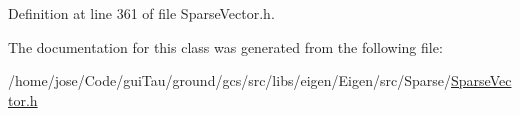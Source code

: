 Definition at line 361 of file Sparse\-Vector.\-h.



The documentation for this class was generated from the following file\-:\begin{DoxyCompactItemize}
\item 
/home/jose/\-Code/gui\-Tau/ground/gcs/src/libs/eigen/\-Eigen/src/\-Sparse/\hyperlink{_sparse_vector_8h}{Sparse\-Vector.\-h}\end{DoxyCompactItemize}
